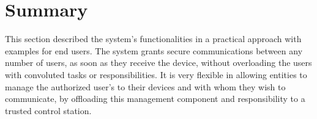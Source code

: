 
\section{Summary}\label{chap:arch:summary}

This section described the system's functionalities in a practical approach with examples for end users.
The system grants secure communications between any number of users, as soon as they receive the device, without overloading the users with convoluted tasks or responsibilities.
It is very flexible in allowing entities to manage the authorized user's to their devices and with whom they wish to communicate, by offloading this management component and responsibility to a trusted control station.
